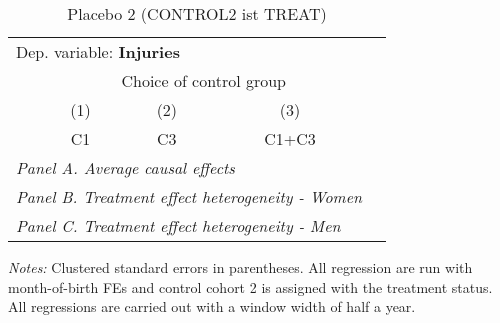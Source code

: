  \begin{table}[H] \centering \begin{threeparttable} \caption{Placebo 2 (CONTROL2 ist TREAT) } {\def\sym#1{\ifmmode^{#1}\else\(^{#1}\)\fi} \begin{tabular}{l*{4}{c}} \toprule \multicolumn{4}{l}{Dep. variable: \textbf{Injuries}} \\ & \multicolumn{3}{c}{Choice of control group} \\ \cmidrule(lr){2-4}
            &\multicolumn{1}{c}{(1)}&\multicolumn{1}{c}{(2)}&\multicolumn{1}{c}{(3)}\\
            &\multicolumn{1}{c}{C1}&\multicolumn{1}{c}{C3}&\multicolumn{1}{c}{C1+C3}\\
\midrule
 \multicolumn{4}{l}{\emph{Panel A. Average causal effects}} \\      \midrule\multicolumn{4}{l}{\emph{Panel B. Treatment effect heterogeneity - Women}} \\      \midrule\multicolumn{4}{l}{\emph{Panel C. Treatment effect heterogeneity - Men}} \\      
\bottomrule \end{tabular} } \begin{tablenotes} \item \scriptsize \emph{Notes:} Clustered standard errors in parentheses. All regression are run with month-of-birth FEs and control cohort 2 is assigned with the treatment status. All regressions are carried out with a window width of half a year. \end{tablenotes} \end{threeparttable} \end{table} 
